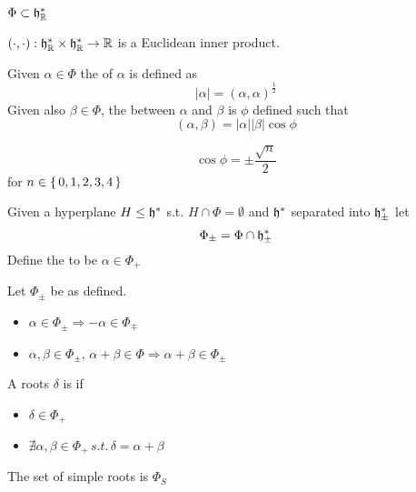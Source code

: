 \documentclass{article}
\begin{document}
\begin{fact}
$\Phi\subset\mathfrak{h}^\ast_{\mathbb{R}}$
\end{fact}

\begin{theorem}
$(\cdot,\cdot) : \mathfrak{h}^\ast_{\mathbb{R}} \times \mathfrak{h}^\ast_{\mathbb{R}} \to \mathbb{R}$ is a Euclidean inner product. 
\end{theorem}

\begin{definition}
Given $\alpha\in\Phi$ the  of $\alpha$ is defined as 
\[
|\alpha|=(\alpha,\alpha)^\frac{1}{2}
\]
Given also $\beta\in\Phi$, the  between $\alpha$ and $\beta$ is $\phi$ defined such that 
\[
(\alpha, \beta) = |\alpha||\beta|\cos{\phi}
\]
\end{definition}

\begin{theorem}
\[
\cos\phi=\pm\frac{\sqrt{n}}{2}
\]
for $n\in\set{  0,1,2,3,4  }$
\end{theorem}

\begin{definition}
Given a hyperplane $H\leq\mathfrak{h}^\ast$ s.t. $H\cap\Phi=\emptyset$ and $\mathfrak{h}^\ast$ separated into $\mathfrak{h}^\ast_\pm$ let 
\[
\Phi_\pm=\Phi\cap\mathfrak{h}^\ast_\pm
\]
Define the  to be $\alpha\in\Phi_+$
\end{definition}

\begin{fact} Let $\Phi_\pm$ be as defined.
\begin{itemize}
    \item $\alpha\in\Phi_\pm \Rightarrow -\alpha\in\Phi_\mp$
    \item $\alpha,\beta\in\Phi_\pm,\, \alpha+\beta\in\Phi \Rightarrow \alpha+\beta\in\Phi_\pm$
\end{itemize}
\end{fact}

\begin{definition}
A roots $\delta$ is  if 
\begin{itemize}
\item $\delta\in\Phi_+$
\item $\nexists \alpha,\beta\in\Phi_+ \, s.t. \, \delta=\alpha+\beta$
\end{itemize}
The set of simple roots is $\Phi_S$
\end{definition}
\end{document}
